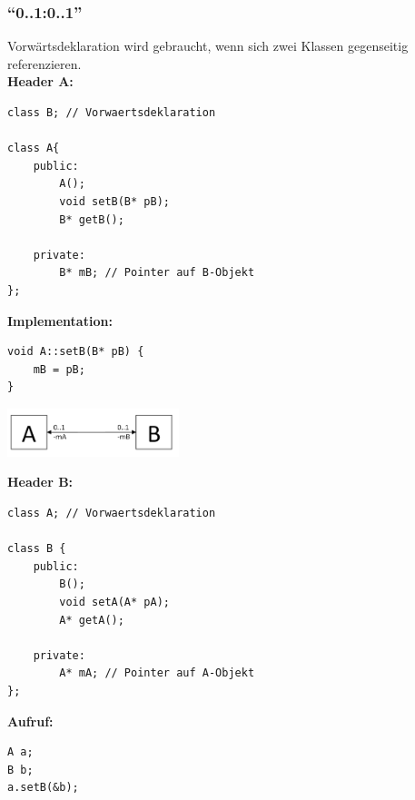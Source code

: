 \subsubsection{"`0..1:0..1"'}
\begin{multicols}{2}
Vorwärtsdeklaration wird gebraucht, wenn sich zwei Klassen gegenseitig referenzieren. \\

\textbf{Header A:}
\begin{lstlisting}
class B; // Vorwaertsdeklaration

class A{
	public:
	    A();
		void setB(B* pB);
		B* getB();
		
	private:
		B* mB; // Pointer auf B-Objekt
};
\end{lstlisting}

\textbf{Implementation:}
\begin{lstlisting}
void A::setB(B* pB) {
	mB = pB;
}
\end{lstlisting}

\columnbreak
\includegraphics[width=5cm]{./images/Assozi_01_01.png}

\textbf{Header B:}
\begin{lstlisting}
class A; // Vorwaertsdeklaration

class B {	
	public:
		B();
		void setA(A* pA);
		A* getA();
		
	private: 
		A* mA; // Pointer auf A-Objekt
};
\end{lstlisting}

\textbf{Aufruf:}
\begin{lstlisting}
A a;
B b;
a.setB(&b);
\end{lstlisting}
\end{multicols}

